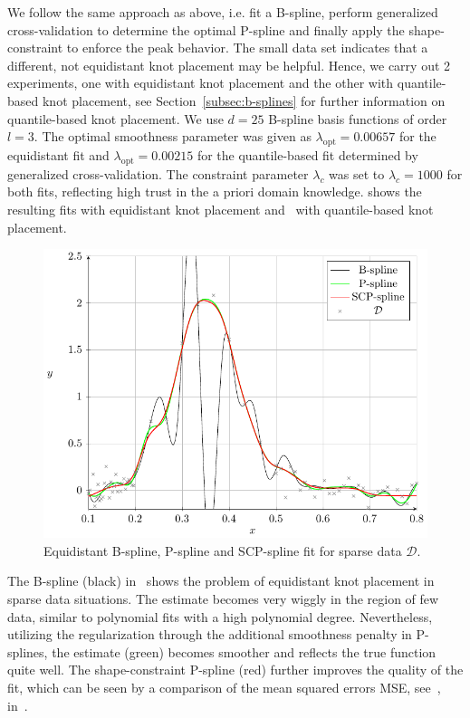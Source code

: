 We follow the same approach as above, i.e. fit a B-spline, perform generalized cross-validation to determine the optimal P-spline and finally apply the shape-constraint to enforce the peak behavior. The small data set indicates that a different, not equidistant knot placement may be helpful. Hence, we carry out 2 experiments, one with equidistant knot placement and the other with quantile-based knot placement, see Section~\ref{subsec:b-splines} for further information on quantile-based knot placement. We use $d=25$ B-spline basis functions of order $l=3$. The optimal smoothness parameter was given as $\lambda_{\mathrm{opt}} = 0.00657$ for the equidistant fit and $\lambda_{\mathrm{opt}} = 0.00215$ for the quantile-based fit determined by generalized cross-validation. The constraint parameter $\lambda_c$ was set to $\lambda_c=1000$ for both fits, reflecting high trust in the a priori domain knowledge.  shows the resulting fits with equidistant knot placement and~ with quantile-based knot placement.


\begin{figure}[H]
	\centering
	\includegraphics{graphics/pgfplots/cha4/exp-sparse-equidistant.pdf}
	\caption{Equidistant B-spline, P-spline and SCP-spline fit for sparse data $\mathcal{D}$.}
	\label{fig:sparse-example-equidistant}
\end{figure}

The B-spline (black) in~ shows the problem of equidistant knot placement in sparse data situations. The estimate becomes very wiggly in the region of few data, similar to polynomial fits with a high polynomial degree. Nevertheless, utilizing the regularization through the additional smoothness penalty in P-splines, the estimate (green) becomes smoother and reflects the true function quite well. The shape-constraint P-spline (red) further improves the quality of the fit, which can be seen by a comparison of the mean squared errors MSE, see~, in~. 

